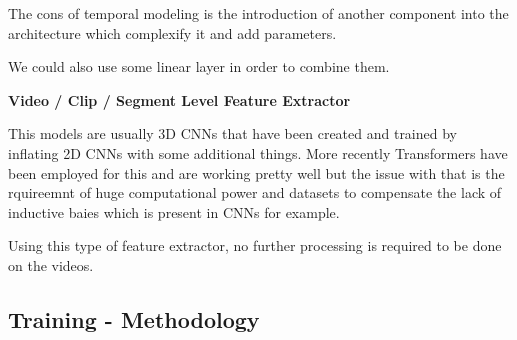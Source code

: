 The cons of temporal modeling is the introduction of another component into the architecture which complexify it and add parameters.

We could also use some linear layer in order to combine them.


\textbf{Video / Clip / Segment Level Feature Extractor}

This models are usually 3D CNNs that have been created and trained by inflating 2D CNNs with some additional things. More recently Transformers have been employed for this and are working pretty well but the issue with that is the rquireemnt of huge computational power and datasets to compensate the lack of inductive baies which is present in CNNs for example.

Using this type of feature extractor, no further processing is required to be done on the videos.

\subsection{Training - Methodology}

